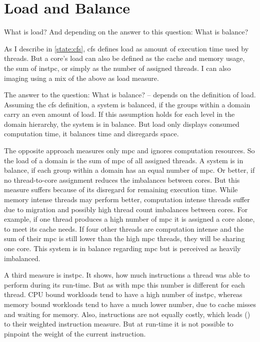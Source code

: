 \section{Load and Balance}
\label{design:load}


What is load?
And depending on the answer to this question: What is balance?

As I describe in \ref{state:cfs}, \gls{cfs} defines load as amount of
execution time used by threads.
But a core's load can also be defined as
the cache and memory usage, the sum of \gls{instpc}, or simply as the number of
assigned threads.
I can also imaging using a mix of the above as load measure.

The answer to the question: What is balance? -- depends on the definition of
load.
Assuming the \gls{cfs} definition, a system is balanced, if the groups within a
domain carry an even amount of load.
If this assumption holds for each level in the domain hierarchy, the system is
in balance.
But load only displays consumed computation time, it balances time and
disregards space.

The opposite approach measures only \gls{mpc} and ignores computation
resources.
So the load of a domain is the sum of \gls{mpc} of all assigned threads.
A system is in balance, if each group within a domain has an equal number of
\gls{mpc}.
Or better, if no thread-to-core assignment reduces the imbalances between cores.
But this measure suffers because of its disregard for remaining execution time.
While memory intense threads may perform better, computation intense threads
suffer due to migration and possibly high thread count imbalances between
cores.
For example, if one thread produces a high number of \gls{mpc} it is assigned a
core alone, to meet its cache needs.
If four other threads are computation intense and the sum of their \gls{mpc} is
still lower than the high \gls{mpc} threads, they will be sharing one core.
This system is in balance regarding \gls{mpc} but is perceived as heavily
imbalanced.

A third measure is \gls{instpc}.
It shows, how much instructions a thread was able to perform during its
run-time.
But as with \gls{mpc} this number is different for each thread.
CPU bound workloads tend to have a high number of \gls{instpc},
whereas memory bound workloads tend to have a much lower number, due to cache
misses and waiting for memory.
Also, instructions are not equally costly, which leads
\citeauthor{snavely_symbiotic_2000} (\cite{snavely_symbiotic_2000}) to their
weighted instruction measure.
But at run-time it is not possible to pinpoint the weight of the current
instruction.

